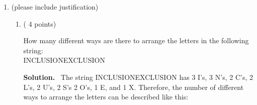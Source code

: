 \documentclass[10pt,letterpaper]{article}
\newenvironment{solution}
  {\par\noindent\textbf{Solution.}\ }
  {\par}
\begin{document}
\begin{enumerate}
\begin{enumerate}
\item
(4 points)
Paintings A,B, and C are all painted by the same artist. How many ways can the museum curator arrange all 9 paintings among the 12 rooms such that paintings A,B, and C are all in the same room?
\begin{solution}
  We take 3 paintings and put them in one of the 12 rooms:
  \begin{center}
    $12$
  \end{center}
  Then the rest of the paintings can go distribute in this many ways:
  \begin{center}
    $12^6$
  \end{center}
  So the total amount of ways to arrange all the paintings comes down to be:
  \begin{center}
    $\boxed{12*12^6\text{ ways}}$
  \end{center}
\end{solution}
\item
(4 points)
How many ways can the museum curator arrange all 9 paintings in 3 of the 12 rooms such that each room has exactly 3 paintings? 

\begin{solution}
  We pick 3 rooms to put paintings into:
  \begin{center}
    $\binom{12}{3}$
  \end{center}
  Then we can pick which 3 paintings go into the first, second and third room:
  \begin{center}
    $\binom{9}{3} * \binom{6}{3} * \binom{3}{3}$
  \end{center}
  Finally, we combine the options and get the final answer:
  \begin{center}
    $\boxed{\binom{12}{3} * (\binom{9}{3} * \binom{6}{3} * \binom{3}{3})}$
  \end{center}
\end{solution}

\end{enumerate}




\item
(please include justification)
\begin{enumerate}
\item
( 4 points)

How many different ways are there to arrange the letters in the following string:\\ 
INCLUSIONEXCLUSION

\begin{solution}
The string INCLUSIONEXCLUSION has 3 I's, 3 N's, 2 C's, 2 L's, 2 U's, 2 S's 2 O's, 1 E, and 1 X. 
Therefore, the number of different ways to arrange the letters can be described like this:
\begin{center}
\end{center}
\end{solution}


\end{enumerate}
\end{enumerate}
\end{document}

